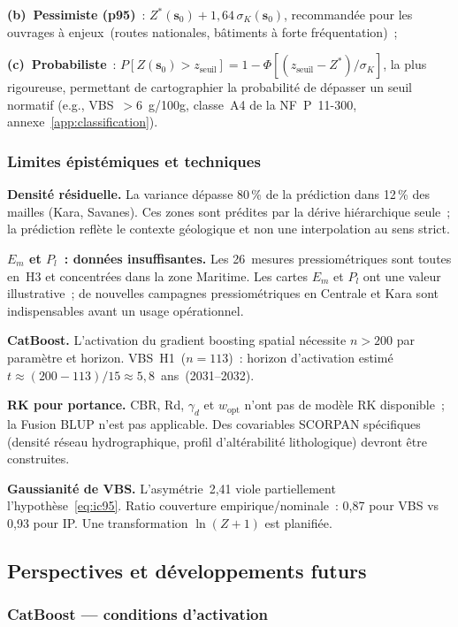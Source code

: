 \documentclass[10pt,a4paper,twocolumn]{article}
\newcommand{\bs}{\mathbf{s}}
\begin{document}
	\textbf{(b)~Pessimiste (p95)}~:
	$Z^*(\bs_0)+1{,}64\,\sigma_K(\bs_0)$,
	recommandée pour les ouvrages à enjeux~(routes nationales,
	bâtiments à forte fréquentation)~;
	
	\textbf{(c)~Probabiliste}~:
	$P[Z(\bs_0)>z_{\mathrm{seuil}}]=
	1-\Phi[(z_{\mathrm{seuil}}-Z^*)/\sigma_K]$,
	la plus rigoureuse, permettant de cartographier la probabilité
	de dépasser un seuil normatif (e.g., VBS~$>6$~g/100g,
	classe~A4 de la NF~P~11-300, annexe~\ref{app:classification}).
	
	\subsubsection{Limites épistémiques et techniques}
	
	\textbf{Densité résiduelle.}
	La variance dépasse 80\,\% de la prédiction dans 12\,\% des
	mailles (Kara, Savanes). Ces zones sont prédites par la dérive
	hiérarchique seule~; la prédiction reflète le contexte géologique
	et non une interpolation au sens strict.
	
	\textbf{$E_m$ et $P_l$~: données insuffisantes.}
	Les 26~mesures pressiométriques sont toutes en~H3 et concentrées
	dans la zone Maritime. Les cartes $E_m$ et $P_l$ ont une valeur
	illustrative~; de nouvelles campagnes pressiométriques en Centrale
	et Kara sont indispensables avant un usage opérationnel.
	
	\textbf{CatBoost.}
	L'activation du gradient boosting spatial nécessite
	$n>200$ par paramètre et horizon.
	VBS~H1~($n=113$)~: horizon d'activation estimé
	$t\approx(200-113)/15\approx5{,}8$~ans~(2031--2032).
	
	\textbf{RK pour portance.}
	CBR, Rd, $\gamma_d$ et $w_{\mathrm{opt}}$ n'ont pas de modèle
	RK disponible~; la Fusion BLUP n'est pas applicable.
	Des covariables SCORPAN spécifiques (densité réseau
	hydrographique, profil d'altérabilité lithologique)
	devront être construites.
	
	\textbf{Gaussianité de VBS.}
	L'asymétrie~2{,}41 viole partiellement l'hypothèse~\eqref{eq:ic95}.
	Ratio couverture empirique/nominale~: 0{,}87 pour VBS
	vs 0{,}93 pour IP. Une transformation $\ln(Z+1)$ est planifiée.
	
	\subsection{Perspectives et développements futurs}
	\label{subsec:perspectives}
	
	\subsubsection{CatBoost --- conditions d'activation}
	
\end{document}
